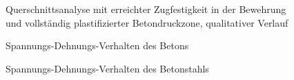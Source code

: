 \documentclass[
  11pt,
  letterpaper,
]{scrreprt}
\begin{document}
\begin{figure}[H]


\caption{\label{fig-qs_widerstand_qualitativ}Querschnittsanalyse mit
erreichter Zugfestigkeit in der Bewehrung und vollständig
plastifizierter Betondruckzone, qualitativer Verlauf}

\end{figure}%

\begin{figure}[H]


\caption{\label{fig-sigma_epc_t6}Spannungs-Dehnungs-Verhalten des
Betons}

\end{figure}%

\begin{figure}[H]


\caption{\label{fig-sigma_eps_t6}Spannungs-Dehnungs-Verhalten des
Betonstahls}

\end{figure}%
\end{document}
